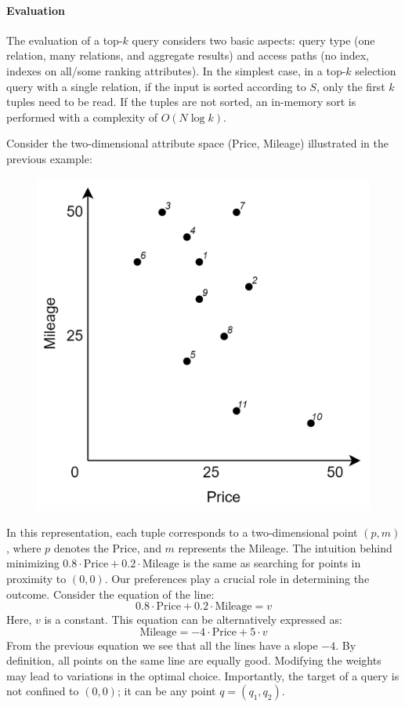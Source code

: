 \paragraph*{Evaluation}
The evaluation of a top-$k$ query considers two basic aspects: query type (one relation, many relations, and aggregate results) and access paths (no index, indexes on all/some ranking attributes).
In the simplest case, in a top-$k$ selection query with a single relation, if the input is sorted according to $S$, only the first $k$ tuples need to be read.
If the tuples are not sorted, an in-memory sort is performed with a complexity of $O(N\log{k})$.
\begin{example}
    Consider the two-dimensional attribute space (Price, Mileage) illustrated in the previous example:
    \begin{figure}[H]
        \centering
        \includegraphics[width=0.35\linewidth]{images/ex1.png}
    \end{figure}
    In this representation, each tuple corresponds to a two-dimensional point $(p, m)$, where $p$ denotes the Price, and $m$ represents the Mileage. 
    The intuition behind minimizing $0.8 \cdot \text{Price} + 0.2 \cdot \text{Mileage}$ is the same as searching for points in proximity to $(0,0)$.
    Our preferences play a crucial role in determining the outcome. 
    Consider the equation of the line:
    \[0.8\cdot \text{Price} + 0.2\cdot \text{Mileage} = v\]
    Here, $v$ is a constant. 
    This equation can be alternatively expressed as:
    \[\text{Mileage} = -4\cdot \text{Price} + 5\cdot v\]
    From the previous equation we see that all the lines have a slope $-4$. 
    By definition, all points on the same line are equally good. 
    Modifying the weights may lead to variations in the optimal choice. 
    Importantly, the target of a query is not confined to $(0,0)$; it can be any point $q=(q_1,q_2)$.
\end{example}


